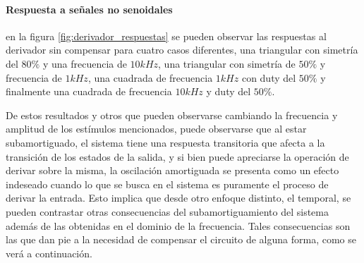 \paragraph*{Respuesta a se\~nales no senoidales} en la figura \ref{fig:derivador_respuestas} se pueden observar las respuestas
al derivador sin compensar para cuatro casos diferentes, una triangular con simetr\'ia del $80\%$ y una frecuencia de $10kHz$,
una triangular con simetr\'ia de $50\%$ y frecuencia de $1kHz$, una cuadrada de frecuencia $1kHz$ con duty del $50\%$ y finalmente una cuadrada
de frecuencia $10kHz$ y duty del $50\%$.

De estos resultados y otros que pueden observarse cambiando la frecuencia y amplitud de los est\'imulos mencionados, puede observarse que al estar subamortiguado,
el sistema tiene una respuesta transitoria que afecta a la transici\'on de los estados de la salida, y si bien puede apreciarse la operaci\'on de derivar sobre la misma,
la oscilaci\'on amortiguada se presenta como un efecto indeseado cuando lo que se busca en el sistema es puramente el proceso de derivar la entrada. Esto implica que desde otro enfoque distinto,
el temporal, se pueden contrastar otras consecuencias del subamortiguamiento del sistema adem\'as de las obtenidas en el dominio de la frecuencia. Tales consecuencias son las que dan pie a la necesidad
de compensar el circuito de alguna forma, como se ver\'a a continuaci\'on.

